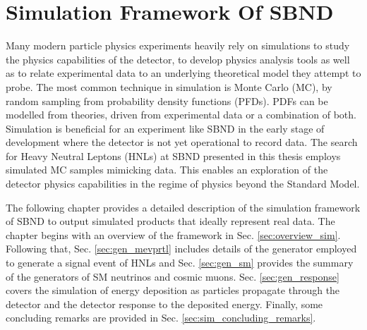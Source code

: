 
\chapter{Simulation Framework Of SBND}
\label{ChapterSim}

\ifpdf
    \graphicspath{{Chapter5/Figs/Raster/}{Chapter5/Figs/PDF/}{Chapter5/Figs/}}
\else
    \graphicspath{{Chapter5/Figs/Vector/}{Chapter5/Figs/}}
\fi


Many modern particle physics experiments heavily rely on simulations to study the physics capabilities of the detector, to develop physics analysis tools as well as to relate experimental data to an underlying theoretical model they attempt to probe.  
The most common technique in simulation is Monte Carlo (MC), by random sampling from probability density functions (PFDs).
PDFs can be modelled from theories, driven from experimental data or a combination of both.
Simulation is beneficial for an experiment like SBND in the early stage of development where the detector is not yet operational to record data.
The search for Heavy Neutral Leptons (HNLs) at SBND presented in this thesis employs simulated MC samples mimicking data.                                 
This enables an exploration of the detector physics capabilities in the regime of physics beyond the Standard Model.

The following chapter provides a detailed description of the simulation framework of SBND to output simulated products that ideally represent real data.
The chapter begins with an overview of the framework in Sec. \ref{sec:overview_sim}.
Following that, Sec. \ref{sec:gen_mevprtl} includes details of the generator employed to generate a signal event of HNLs and Sec. \ref{sec:gen_sm} provides the summary of the generators of SM neutrinos and cosmic muons.
Sec. \ref{sec:gen_response} covers the simulation of energy deposition as particles propagate through the detector and the detector response to the deposited energy.
Finally, some concluding remarks are provided in Sec. \ref{sec:sim_concluding_remarks}.

